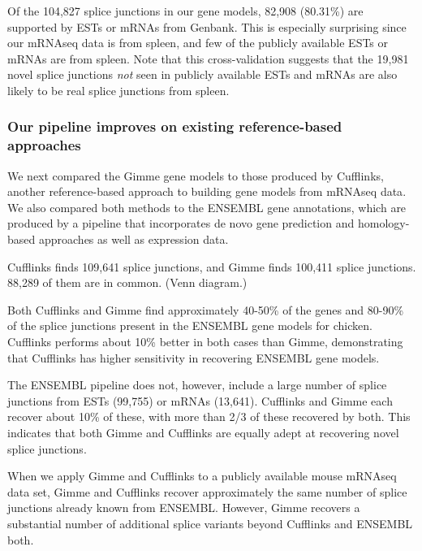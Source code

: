 \documentclass[10pt]{article}
\begin{document}
Of the 104,827 splice junctions in our gene models, 82,908 (80.31\%)
are supported by ESTs or mRNAs from Genbank.  This is especially
surprising since our mRNAseq data is from spleen, and few of the
publicly available ESTs or mRNAs are from spleen.  Note that this
cross-validation suggests that the 19,981 novel splice junctions {\em not}
seen in publicly available ESTs and mRNAs are also likely to be real
splice junctions from spleen.

\subsubsection*{Our pipeline improves on existing reference-based approaches}

We next compared the Gimme gene models to those produced by Cufflinks,
another reference-based approach to building gene models from mRNAseq
data\cite{Trapnell:2010kd}.  We also compared both methods to the ENSEMBL gene annotations,
which are produced by a pipeline that incorporates de novo gene
prediction and homology-based approaches as well as expression data.

Cufflinks finds 109,641 splice junctions, and Gimme finds 100,411
splice junctions.  88,289 of them are in common.  (Venn diagram.)

Both Cufflinks and Gimme find approximately 40-50\% of the genes and
80-90\% of the splice junctions present in the ENSEMBL gene models
for chicken.  Cufflinks performs about 10\% better in both cases
than Gimme, demonstrating that Cufflinks has higher sensitivity
in recovering ENSEMBL gene models.

The ENSEMBL pipeline does not, however, include a large number of
splice junctions from ESTs (99,755) or mRNAs (13,641).  Cufflinks and
Gimme each recover about 10\% of these, with more than 2/3 of these
recovered by both.  This indicates that both Gimme and Cufflinks
are equally adept at recovering novel splice junctions.

When we apply Gimme and Cufflinks to a publicly available mouse
mRNAseq data set, Gimme and Cufflinks recover approximately the same
number of splice junctions already known from ENSEMBL.  However, Gimme
recovers a substantial number of additional splice variants beyond
Cufflinks and ENSEMBL both.
\end{document}
